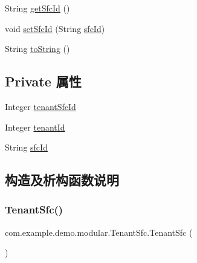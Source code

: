 \begin{DoxyCompactItemize}
\item 
String \mbox{\hyperlink{classcom_1_1example_1_1demo_1_1modular_1_1_tenant_sfc_a957e80898ec4a7debf1df4d1c74394a3}{get\+Sfc\+Id}} ()
\item 
void \mbox{\hyperlink{classcom_1_1example_1_1demo_1_1modular_1_1_tenant_sfc_a55eeb7ab5a59b0fa173252ccd9bab3b7}{set\+Sfc\+Id}} (String \mbox{\hyperlink{classcom_1_1example_1_1demo_1_1modular_1_1_tenant_sfc_a53f057c5be72cd08f00da203f79ce570}{sfc\+Id}})
\item 
String \mbox{\hyperlink{classcom_1_1example_1_1demo_1_1modular_1_1_tenant_sfc_a054efcc29cc07591df97d55d4ef4c0df}{to\+String}} ()
\end{DoxyCompactItemize}
\subsection*{Private 属性}
\begin{DoxyCompactItemize}
\item 
Integer \mbox{\hyperlink{classcom_1_1example_1_1demo_1_1modular_1_1_tenant_sfc_a13f42212db191895a4b8f0b460950901}{tenant\+Sfc\+Id}}
\item 
Integer \mbox{\hyperlink{classcom_1_1example_1_1demo_1_1modular_1_1_tenant_sfc_ab6b926216037da5939301551fd2623f2}{tenant\+Id}}
\item 
String \mbox{\hyperlink{classcom_1_1example_1_1demo_1_1modular_1_1_tenant_sfc_a53f057c5be72cd08f00da203f79ce570}{sfc\+Id}}
\end{DoxyCompactItemize}


\subsection{构造及析构函数说明}
\mbox{\label{classcom_1_1example_1_1demo_1_1modular_1_1_tenant_sfc_a6cff64c6e12a0feb04c8b78891fbe3ee}} 
\subsubsection{\texorpdfstring{Tenant\+Sfc()}{TenantSfc()}\hspace{0.1cm}{\footnotesize\ttfamily [1/3]}}
{\footnotesize\ttfamily com.\+example.\+demo.\+modular.\+Tenant\+Sfc.\+Tenant\+Sfc (\begin{DoxyParamCaption}{ }\end{DoxyParamCaption})}

